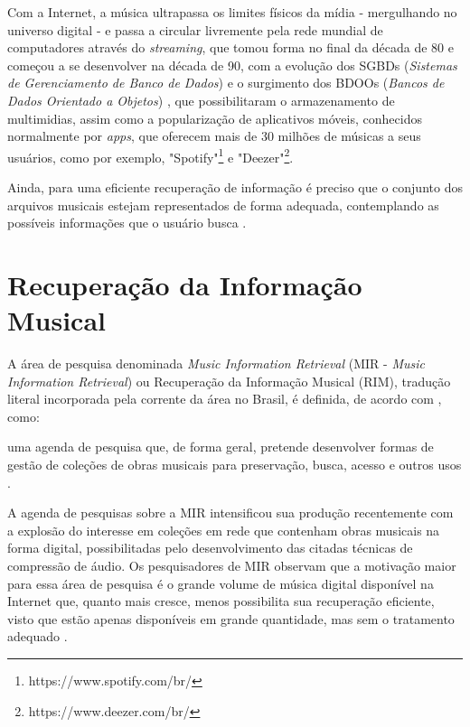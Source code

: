 Com a Internet, a música ultrapassa os limites físicos da mídia - mergulhando no universo digital - e passa a circular livremente pela rede mundial de computadores através do \textit{streaming}, que tomou forma no final da década de 80 e começou a se desenvolver na década de 90, com a evolução dos SGBDs  (\textit{Sistemas de Gerenciamento de Banco de Dados}) e o surgimento dos BDOOs (\textit{Bancos de Dados Orientado a Objetos}) \cite{junior&segundo2008}, que possibilitaram o armazenamento de multimidias, assim como a popularização de aplicativos móveis, conhecidos normalmente por \textit{apps}, que oferecem mais de 30 milhões de músicas a seus usuários, como por exemplo, "Spotify"\footnote{https://www.spotify.com/br/} e "Deezer"\footnote{https://www.deezer.com/br/}.

Ainda, para uma eficiente recuperação de informação é preciso que o conjunto dos arquivos musicais estejam representados de forma adequada, contemplando as possíveis informações que o usuário busca \cite{ferreira2015}.

\section{Recuperação da Informação Musical} \label{sec:recuperacao}

A área de pesquisa denominada \textit{Music Information Retrieval} (MIR - \textit{Music Information Retrieval}) ou Recuperação da Informação Musical (RIM), tradução literal incorporada pela corrente da área no Brasil, é definida, de acordo com , como:

\begin{citacao}
[...] uma agenda de pesquisa que, de forma geral, pretende desenvolver formas de gestão de coleções de obras musicais para preservação, busca, acesso e outros usos \cite{futrelle&downie2002}.
\end{citacao}

A agenda de pesquisas sobre a MIR intensificou sua produção recentemente com a explosão do interesse em coleções em rede que contenham obras musicais na forma digital, possibilitadas pelo desenvolvimento das citadas técnicas de compressão de áudio. Os pesquisadores de MIR observam que a motivação maior para essa área de pesquisa é o grande volume de música digital disponível na Internet que, quanto mais cresce, menos possibilita sua recuperação eficiente, visto que estão apenas disponíveis em grande quantidade, mas sem o tratamento adequado \cite{gomes2015}.

